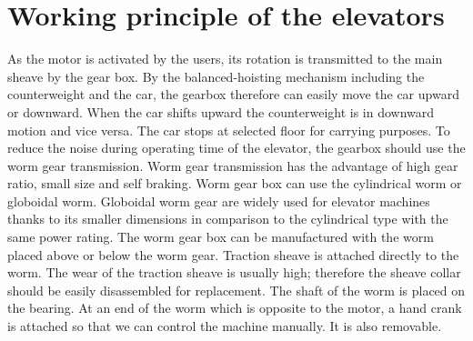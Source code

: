 \section{Working principle of the elevators}

As the motor is activated by the users, its rotation is transmitted to the main sheave by the gear box. By the balanced-hoisting mechanism including the counterweight and the car, the gearbox therefore can easily move the car upward or downward. When the car shifts upward the counterweight is in downward motion and vice versa. The car stops at selected floor for carrying purposes.
To reduce the noise during operating time of the elevator, the gearbox should use the worm gear transmission. Worm gear transmission has the advantage of high gear ratio, small size and self braking.
Worm gear box can use the cylindrical worm or globoidal worm. Globoidal worm gear are widely used for elevator machines thanks to its smaller dimensions in comparison to the cylindrical type with the same power rating. 
The worm gear box can be manufactured with the worm placed above or below the worm gear. Traction sheave is attached directly to the worm. The wear of the traction sheave is usually high; therefore the sheave collar should be easily disassembled for replacement. The shaft of the worm is placed on the bearing. At an end of the worm which is opposite to the motor, a hand crank is attached so that we can control the machine manually. It is also removable.

\newpage
